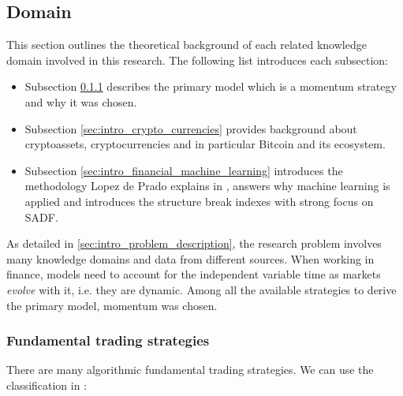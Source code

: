 \subsection{Domain}
\label{sec:intro_domain}

This section outlines the theoretical background of each related knowledge domain involved in this research. The following list introduces each subsection:

\begin{itemize}
    \item Subsection \ref{sec:intro_fundamental_trading_strategies} describes the primary model which is a momentum strategy and why it was chosen.
    \item Subsection \ref{sec:intro_crypto_currencies} provides background about cryptoassets, cryptocurrencies and in particular Bitcoin and its ecosystem.
    \item Subsection \ref{sec:intro_financial_machine_learning} introduces the methodology Lopez de Prado explains in \cite{lopez_de_prado}, answers why machine learning is applied and introduces the structure break indexes with strong focus on SADF.
\end{itemize}

As detailed in \ref{sec:intro_problem_description}, the research problem involves many knowledge domains and data from different sources. When working in finance, models need to account for the independent variable time as markets \emph{evolve} with it, i.e. they are dynamic. Among all the available strategies to derive the primary model, momentum was chosen.

\subsubsection{Fundamental trading strategies}
\label{sec:intro_fundamental_trading_strategies}

There are many algorithmic fundamental trading strategies. We can use the classification in \cite{oxford_handbook}:

